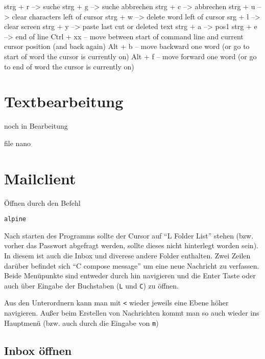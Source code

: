 \documentclass[]{book}
\begin{document}
strg + r --\textgreater{} suche
strg + g --\textgreater{} suche abbrechen
strg + c --\textgreater{} abbrechen
strg + u --\textgreater{} clear characters left of cursor
strg + w --\textgreater{} delete word left of cursor
srg + l --\textgreater{} clear screen
strg + y --\textgreater{} paste last cut or deleted text
strg + a --\textgreater{} pos1
strg + e --\textgreater{} end of line
Ctrl + xx -- move between start of command line and current cursor position (and back again)
Alt + b -- move backward one word (or go to start of word the cursor is currently on)
Alt + f -- move forward one word (or go to end of word the cursor is currently on)

\hypertarget{textbearbeitung}{%
\chapter{Textbearbeitung}\label{textbearbeitung}}

noch in Bearbeitung

file
nano

\hypertarget{mailclient}{%
\chapter{Mailclient}\label{mailclient}}

Öffnen durch den Befehl

\begin{verbatim}
alpine
\end{verbatim}

Nach starten des Programms sollte der Cursor auf ``L Folder List'' stehen (bzw. vorher das Passwort abgefragt werden, sollte dieses nicht hinterlegt worden sein). In diesem ist auch die Inbox und diverese andere Folder enthalten. Zwei Zeilen darüber befindet sich ``C compose message'' um eine neue Nachricht zu verfassen. Beide Menüpunkte sind entweder durch hin navigieren und die Enter Taste oder auch über Eingabe der Buchstaben (\texttt{L} und \texttt{C}) zu öffnen.

Aus den Unterordnern kann man mit \texttt{\textless{}} wieder jeweils eine Ebene höher navigieren. Außer beim Erstellen von Nachrichten kommt man so auch wieder ins Hauptmenü (bzw. auch durch die Eingabe von \texttt{m})

\hypertarget{inbox-offnen}{%
\section{Inbox öffnen}\label{inbox-offnen}}
\end{document}
